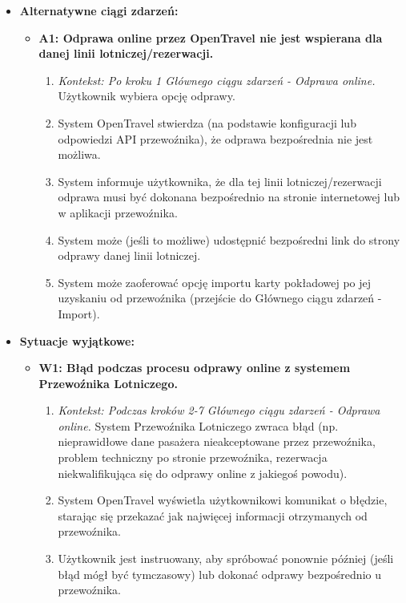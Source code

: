 \documentclass[a4paper,12pt]{article}
\begin{document}
\begin{itemize}
    \item \textbf{Alternatywne ciągi zdarzeń:}
        \begin{itemize}
            \item \textbf{A1: Odprawa online przez OpenTravel nie jest wspierana dla danej linii lotniczej/rezerwacji.}
                \begin{enumerate}
                    \item \textit{Kontekst: Po kroku 1 Głównego ciągu zdarzeń - Odprawa online.} Użytkownik wybiera opcję odprawy.
                    \item System OpenTravel stwierdza (na podstawie konfiguracji lub odpowiedzi API przewoźnika), że odprawa bezpośrednia nie jest możliwa.
                    \item System informuje użytkownika, że dla tej linii lotniczej/rezerwacji odprawa musi być dokonana bezpośrednio na stronie internetowej lub w aplikacji przewoźnika.
                    \item System może (jeśli to możliwe) udostępnić bezpośredni link do strony odprawy danej linii lotniczej.
                    \item System może zaoferować opcję importu karty pokładowej po jej uzyskaniu od przewoźnika (przejście do Głównego ciągu zdarzeń - Import).
                \end{enumerate}
        \end{itemize}
    \item \textbf{Sytuacje wyjątkowe:}
        \begin{itemize}
            \item \textbf{W1: Błąd podczas procesu odprawy online z systemem Przewoźnika Lotniczego.}
                \begin{enumerate}
                    \item \textit{Kontekst: Podczas kroków 2-7 Głównego ciągu zdarzeń - Odprawa online.} System Przewoźnika Lotniczego zwraca błąd (np. nieprawidłowe dane pasażera nieakceptowane przez przewoźnika, problem techniczny po stronie przewoźnika, rezerwacja niekwalifikująca się do odprawy online z jakiegoś powodu).
                    \item System OpenTravel wyświetla użytkownikowi komunikat o błędzie, starając się przekazać jak najwięcej informacji otrzymanych od przewoźnika.
                    \item Użytkownik jest instruowany, aby spróbować ponownie później (jeśli błąd mógł być tymczasowy) lub dokonać odprawy bezpośrednio u przewoźnika.

\end{enumerate}
\end{itemize}
\end{itemize}
\end{document}
